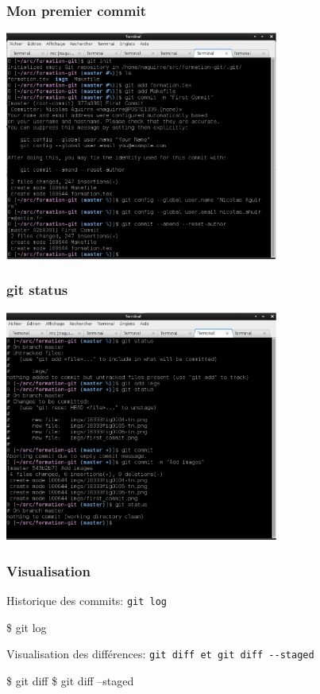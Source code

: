 \documentclass{beamer}
\begin{document}
  \begin{frame}
     \frametitle{Mon premier commit}
     \includegraphics[width=9cm]{imgs/first_commit.eps}
  \end{frame}

  \begin{frame}
     \frametitle{git status}
     \includegraphics[width=9cm]{imgs/status.eps}
  \end{frame}

\begin{frame}[fragile]\frametitle{Visualisation}
  Historique des commits: \verb|git log|

  \begin{semiverbatim}
  \$ \alert{git log}
  \end{semiverbatim}

  Visualisation des différences: \verb|git diff et git diff --staged|
  \begin{semiverbatim}
  \$ \alert{git diff}
  \$ \alert{git diff --staged}
  \end{semiverbatim}

\end{frame}
\end{document}
